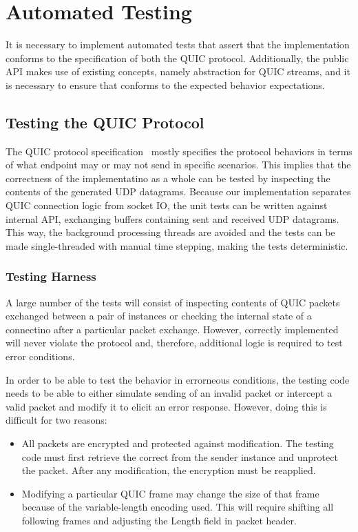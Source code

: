 \section{Automated Testing}

It is necessary to implement automated tests that assert that the implementation conforms to the
specification of both the QUIC protocol. Additionally, the public API makes use of existing
concepts, namely  abstraction for QUIC streams, and it is necessary to ensure that
\QuicStream{} conforms to the expected  behavior expectations.

\subsection{Testing the QUIC Protocol}

The QUIC protocol specification~\cite{draft-ietf-quic-transport} mostly specifies the protocol
behaviors in terms of what endpoint may or may not send in specific scenarios. This implies that the
correctness of the implementatino as a whole can be tested by inspecting the contents of the
generated UDP datagrams. Because our implementation separates QUIC connection logic from socket IO,
the unit tests can be written against internal \QuicConnection{} API, exchanging buffers containing
sent and received UDP datagrams. This way, the background processing threads are avoided and the
tests can be made single-threaded with manual time stepping, making the tests deterministic.

\subsubsection{Testing Harness}

A large number of the tests will consist of inspecting contents of QUIC packets exchanged between a
pair of \QuicConnection{} instances or checking the internal state of a connectino after a
particular packet exchange. However, correctly implemented \QuicConnection{} will never violate the
protocol and, therefore, additional logic is required to test error conditions.

In order to be able to test the behavior in errorneous conditions, the testing code needs to be able
to either simulate sending of an invalid packet or intercept a valid packet and modify it to elicit
an error response. However, doing this is difficult for two reasons:

\begin{itemize}

  \item All packets are encrypted and protected against modification. The testing code must first retrieve the correct \CryptoSeal{} from the sender \QuicConnection{} instance and unprotect the packet. After any modification, the encryption must be reapplied.

  \item Modifying a particular QUIC frame may change the size of that frame because of the variable-length encoding used. This will require shifting all following frames and adjusting the Length field in packet header.

\end{itemize}

